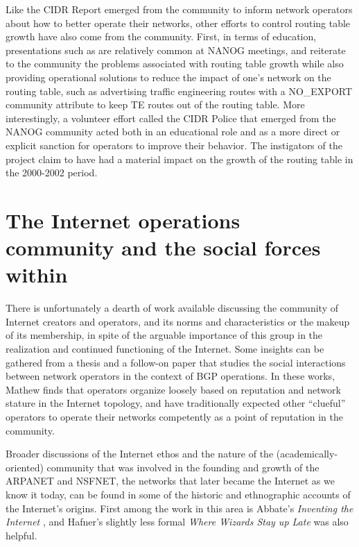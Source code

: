 Like the CIDR Report emerged from the community to inform network operators
about how to better operate their networks, other efforts to control routing
table growth have also come from the community. First, in terms of education,
presentations such as \cite{Steenbergen:2010nx} are relatively common at NANOG
meetings, and reiterate to the community the problems associated with routing
table growth while also providing operational solutions to reduce the impact of
one's network on the routing table, such as advertising traffic engineering
routes with a NO\_EXPORT community attribute to keep TE routes out of the
routing table.  More interestingly, a volunteer effort called the CIDR Police
\cite{Nussbacher:2003ys} that emerged from the NANOG community acted both in an
educational role and as a more direct or explicit sanction for operators to
improve their behavior. The instigators of the project claim to have had a
material impact on the growth of the routing table in the 2000-2002 period.

\section{The Internet operations community and the social forces within}

There is unfortunately a dearth of work available discussing the community of
Internet creators and operators, and its norms and characteristics or the
makeup of its membership, in spite of the arguable importance of this group in
the realization and continued functioning of the Internet. Some insights can be
gathered from a thesis \cite{Mathew:2009dz} and a follow-on paper
\cite{Mathew:2010ly} that studies the social interactions between network
operators in the context of BGP operations. In these works, Mathew finds that
operators organize loosely based on reputation and network stature in the
Internet topology, and have traditionally expected other ``clueful'' operators
to operate their networks competently as a point of reputation in the community.

Broader discussions of the Internet ethos and the nature of the
(academically-oriented) community that was involved in the founding and growth
of the ARPANET and NSFNET, the networks that later became the Internet as we
know it today, can be found in some of the historic and ethnographic accounts
of the Internet's origins. First among the work in this area is Abbate's
\emph{Inventing the Internet} \cite{Abbate:2000ve}, and Hafner's slightly less
formal \emph{Where Wizards Stay up Late} \cite{Hafner:1996qf} was also helpful.

